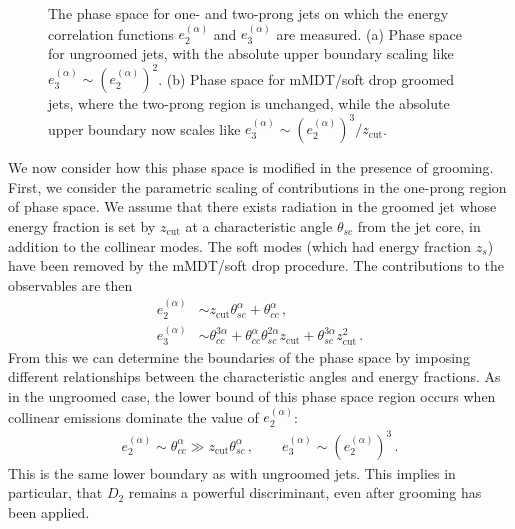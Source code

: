 \documentclass[a4paper,11pt]{article}
\newcommand{\ecf}[2]{e_{#1}^{(#2)}}
\newcommand{\nn}{\nonumber}
\def\zcut{z_{\text{cut}}}
\begin{document}
\begin{figure}
\begin{center}
\qquad
{}
\end{center}
\caption{The phase space for one- and two-prong jets on which the energy correlation functions $\ecf{2}{\alpha}$ and $\ecf{3}{\alpha}$ are measured.  (a) Phase space for ungroomed jets, with the absolute upper boundary scaling like $\ecf{3}{\alpha} \sim (\ecf{2}{\alpha})^2$.  (b) Phase space for mMDT/soft drop groomed jets, where the two-prong region is unchanged, while the absolute upper boundary now scales like $\ecf{3}{\alpha} \sim (\ecf{2}{\alpha})^3/\zcut$.
}
\label{fig:phasespace}
\end{figure}


We now consider how this phase space is modified in the presence of grooming.  First, we consider the parametric scaling of contributions in the one-prong region of phase space. We assume that there exists radiation in the groomed jet whose energy fraction is set by $\zcut$ at a characteristic angle $\theta_{sc}$ from the jet core, in addition to the collinear modes. The soft modes (which had energy fraction $z_s$) have been removed by the mMDT/soft drop procedure.  The contributions to the observables are then
\begin{align}
\ecf{2}{\alpha} &\sim \zcut \theta_{sc}^\alpha +\theta_{cc}^\alpha\,, \nn \\
\ecf{3}{\alpha} &\sim \theta_{cc}^{3\alpha}+\theta_{cc}^\alpha \theta_{sc}^{2\alpha} \zcut+\theta_{sc}^{3\alpha} \zcut^2\,.
\end{align}
From this we can determine the boundaries of the phase space by imposing different relationships between the characteristic angles and energy fractions.  As in the ungroomed case, the lower bound of this phase space region occurs when collinear emissions dominate the value of $\ecf{2}{\alpha}$:
\begin{align}
\ecf{2}{\alpha} \sim \theta_{cc}^\alpha \gg \zcut \theta_{sc}^\alpha\,, \qquad  \ecf{3}{\alpha}\sim (\ecf{2}{\alpha})^3\,.
\end{align}
This is the same lower boundary as with ungroomed jets. This implies in particular, that $D_2$ remains a powerful discriminant, even after grooming has been applied.
\end{document}
